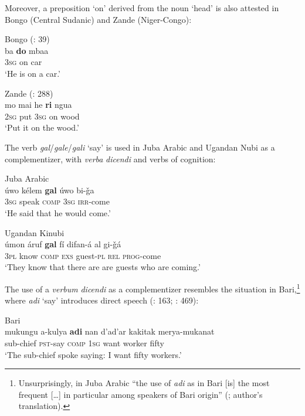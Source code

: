 \documentclass[output=paper]{langsci/langscibook}
\begin{document}
Moreover, a preposition ‘on’ derived from the noun ‘head’ is also attested in Bongo (Central Sudanic) and Zande (Niger-Congo):

\ea
{Bongo (\citealt{Moietal2014}: 39)}\\
\gll            ba \textbf{do} mbaa\\
                3\textsc{sg} on car\\
\glt     `He is on a car.'
\z

\ea
{Zande (\citealt{DeAngelis2002}: 288)}\\
\gll            mo mai he \textbf{ri} ngua\\
                2\textsc{sg} put 3\textsc{sg} on wood\\
\glt     `Put it on the wood.'
\z

The verb \textit{gal}/\textit{gale}/\textit{gali} ‘say’ is used in Juba Arabic and Ugandan Nubi as a complementizer, with \textit{verba} \textit{dicendi} and verbs of cognition:

\ea
\ea Juba Arabic \citep[469]{Miller2001}\\
\gll     úwo kélem \textbf{gal} úwo bi-ǧa\\
         3\textsc{sg} speak \textsc{comp} 3\textsc{sg} \textsc{irr}-come\\
\glt       `He said that he would come.'

\ex
Ugandan Kinubi \citep[204]{Wellens2003}\\
\gll     úmon áruf \textbf{gal} fí difan-á al gi-ǧá\\
         3\textsc{pl} know \textsc{comp} \textsc{exs} guest-\textsc{pl} \textsc{rel} \textsc{prog}-come\\
\glt    `They know that there are are guests who are coming.' 
\z
\z

The use of a \textit{verbum} \textit{dicendi} as a complementizer resembles the situation in Bari,\footnote{Unsurprisingly, in Juba Arabic “the use of \textit{adi} as in Bari [is] the most frequent […] in particular among speakers of Bari origin” (\citealt[470]{Miller2001}; author's translation).} where \textit{adi} ‘say’ introduces direct speech (\citealt{Owens1997}: 163; \citealt{Miller2001}: 469): 

\ea

{Bari \citep[469]{Miller2001}}\\
\gll    mukungu a-kulya \textbf{adi} nan d'ad'ar kakitak merya-mukanat\\
                sub-chief \textsc{pst}-say \textsc{comp} 1\textsc{sg} want worker fifty\\
\glt     `The sub-chief spoke saying: I want fifty workers.'
\z
\end{document}
